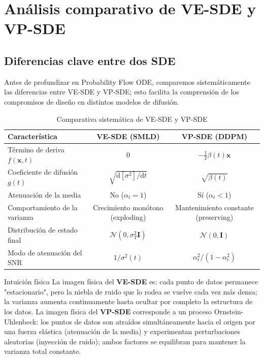 \section{Análisis comparativo de VE-SDE y VP-SDE}

\subsection{Diferencias clave entre dos SDE}

Antes de profundizar en Probability Flow ODE, comparemos sistemáticamente las diferencias entre VE-SDE y VP-SDE; esto facilita la comprensión de los compromisos de diseño en distintos modelos de difusión.

\begin{table}[H]
\centering
\begin{tabular}{lcc}
\toprule
\textbf{Característica} & \textbf{VE-SDE (SMLD)} & \textbf{VP-SDE (DDPM)} \\
\midrule
Término de deriva $f(\mathbf{x},t)$ & $0$ & $-\frac{1}{2}\beta(t)\mathbf{x}$ \\
Coeficiente de difusión $g(t)$ & $\sqrt{\mathrm{d}[\sigma^2]/\mathrm{d}t}$ & $\sqrt{\beta(t)}$ \\
Atenuación de la media & No ($\alpha_t = 1$) & Sí ($\alpha_t < 1$) \\
Comportamiento de la varianza & Crecimiento monótono (exploding) & Mantenimiento constante (preserving) \\
Distribución de estado final & $\mathcal{N}(0, \sigma_T^2 \mathbf{I})$ & $\mathcal{N}(0, \mathbf{I})$ \\
Modo de atenuación del SNR & $1/\sigma^2(t)$ & $\alpha_t^2/(1-\alpha_t^2)$ \\
\bottomrule
\end{tabular}
\caption{Comparativa sistemática de VE-SDE y VP-SDE}
\end{table}

\begin{knowledgebox}{Intuición física}
La imagen física del \textbf{VE-SDE} es: cada punto de datos permanece "estacionario", pero la niebla de ruido que lo rodea se vuelve cada vez más densa; la varianza aumenta continuamente hasta ocultar por completo la estructura de los datos. La imagen física del \textbf{VP-SDE} corresponde a un proceso Ornstein-Uhlenbeck: los puntos de datos son atraídos simultáneamente hacia el origen por una fuerza elástica (atenuación de la media) y experimentan perturbaciones aleatorias (inyección de ruido); ambos factores se equilibran para mantener la varianza total constante.
\end{knowledgebox}

